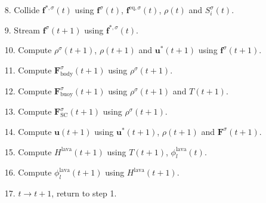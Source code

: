 \begin{itemize}
    \item[8.] Collide $\bm{f}^{*, \sigma}(t)$ using $\bm{f}^\sigma(t)$, $\bm{f}^{\text{eq},\sigma}(t)$, $\rho(t)$ and $S_i^\sigma(t)$.
    \item[9.] Stream $\bm{f}^\sigma(t+1)$ using $\bm{f}^{*, \sigma}(t)$. 
    \item[10.] Compute $\rho^\sigma(t+1)$, $\rho(t+1)$ and $\bm{u}^\ast(t+1)$ using $\bm{f}^\sigma(t+1)$.
    \item[11.] Compute $\bm{F}^\sigma_{\text{body}}(t+1)$ using $\rho^\sigma(t+1)$.
    \item[12.] Compute $\bm{F}^\sigma_{\text{buoy}}(t+1)$ using $\rho^\sigma(t+1)$ and $T(t+1)$.
    \item[13.] Compute $\bm{F}^\sigma_{\text{SC}}(t+1)$ using $\rho^\sigma(t+1)$.
    \item[14.] Compute $\bm{u}(t+1)$ using $\bm{u}^\ast(t+1)$, $\rho(t+1)$ and $\bm{F}^\sigma(t+1)$.
    \item[15.] Compute $H^{\text{lava}}(t+1)$ using $T(t+1)$, $\phi_l^{\text{lava}}(t)$.
    \item[16.] Compute $\phi_l^{\text{lava}}(t+1)$ using $H^{\text{lava}}(t+1)$.
    \item[17.] $t \rightarrow t+1$, return to step 1. 
\end{itemize}